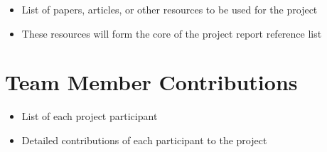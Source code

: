 \documentclass{article}
\begin{document}
\begin{itemize}
    \item List of papers, articles, or other resources to be used for the
          project
    \item These resources will form the core of the project report reference
          list
\end{itemize}

\section{Team Member Contributions}

\begin{itemize}
    \item List of each project participant
    \item Detailed contributions of each participant to the project
\end{itemize}
\end{document}
